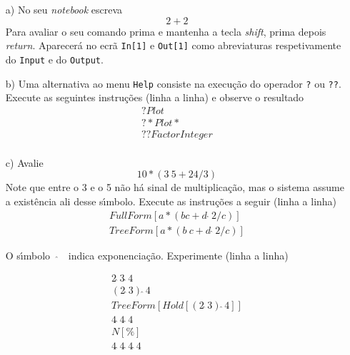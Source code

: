 \documentclass[11pt]{article}
\begin{document}
\begin{itemize}

\item[a)] No seu \textsl{notebook} escreva
\[
2+2
\]
Para avaliar o seu comando prima e mantenha a tecla \textsl{shift}, prima depois \textsl{return}. Aparecer\'a no ecr\~a \texttt{In[1]} e \texttt{Out[1]} como abreviaturas respetivamente do  \texttt{Input} e do \texttt{Output}. 

\item[b)]   Uma alternativa ao menu \texttt{Help} consiste na execu\c{c}\~ao do operador \texttt{?} ou \texttt{??}. Execute as seguintes instru\c{c}\~oes (linha a linha) e observe o resultado
 \[\begin{array}{l}
?Plot\\
?\!\ast \!Plot \ast\\
  ??FactorInteger\\
\end{array}
 \]


\item[c)] Avalie
\[
10\ast (3 \ 5+24/3)
\]
 Note que entre o 3 e o 5 n\~ao h\'a sinal de multiplica\c{c}\~ao, mas o sistema
assume a exist\^encia ali desse s\'\i mbolo.
Execute as instru\c{c}\~oes a seguir (linha a linha)
 \[\begin{array}{l}
FullForm[a\ast(  bc + d\ \widehat{}\ 2 /c) ]\\ T reeF orm[a\ast(  b \ c + d\ \widehat{}\ 2 /c)]
 \end{array} \]
 
  

O s\'\i mbolo \ $\widehat{}$\ \, indica exponencia\c{c}\~ao. Experimente (linha a linha)


 \[\begin{array}{l}
2\,\hat{}\, 3\,\hat{}\, 4 \\ (2\,\hat{}\, 3)\,\hat{}\,4 
 \\ TreeForm[Hold[(2\,\hat{}\, 3)\,\hat{}\, 4]]
\\ 4\,\hat{}\, 4\,\hat{}\, 4 \\
N[\%]\\
4\,\hat{}\, 4\,\hat{}\, 4 \,\hat{}\, 4
\end{array} \]


\end{itemize}
\end{document}
